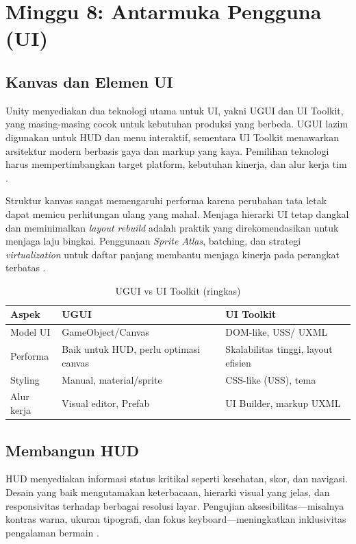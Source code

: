 \documentclass[../main.tex]{subfiles}
\begin{document}
\chapter{Minggu 8: Antarmuka Pengguna (UI)}

\section{Kanvas dan Elemen UI}
Unity menyediakan dua teknologi utama untuk UI, yakni UGUI dan UI Toolkit, yang masing-masing cocok untuk kebutuhan produksi yang berbeda. UGUI lazim digunakan untuk HUD dan menu interaktif, sementara UI Toolkit menawarkan arsitektur modern berbasis gaya dan markup yang kaya. Pemilihan teknologi harus mempertimbangkan target platform, kebutuhan kinerja, dan alur kerja tim \parencite{unity-ui}.

Struktur kanvas sangat memengaruhi performa karena perubahan tata letak dapat memicu perhitungan ulang yang mahal. Menjaga hierarki UI tetap dangkal dan meminimalkan \textit{layout rebuild} adalah praktik yang direkomendasikan untuk menjaga laju bingkai. Penggunaan \textit{Sprite Atlas}, batching, dan strategi \textit{virtualization} untuk daftar panjang membantu menjaga kinerja pada perangkat terbatas \parencite{unity-ui}.

\begin{table}[h]
  \centering
  \caption{UGUI vs UI Toolkit (ringkas)}
  \begin{tabularx}{\textwidth}{@{}lXX@{}}
    \toprule
    Aspek & UGUI & UI Toolkit \\
    \midrule
    Model UI & GameObject/Canvas & DOM-like, USS/ UXML \\
    Performa & Baik untuk HUD, perlu optimasi canvas & Skalabilitas tinggi, layout efisien \\
    Styling & Manual, material/sprite & CSS-like (USS), tema \\
    Alur kerja & Visual editor, Prefab & UI Builder, markup UXML \\
    \bottomrule
  \end{tabularx}
\end{table}

\section{Membangun HUD}
HUD menyediakan informasi status kritikal seperti kesehatan, skor, dan navigasi. Desain yang baik mengutamakan keterbacaan, hierarki visual yang jelas, dan responsivitas terhadap berbagai resolusi layar. Pengujian aksesibilitas—misalnya kontras warna, ukuran tipografi, dan fokus keyboard—meningkatkan inklusivitas pengalaman bermain \parencite{unity-ui}.
\end{document}
